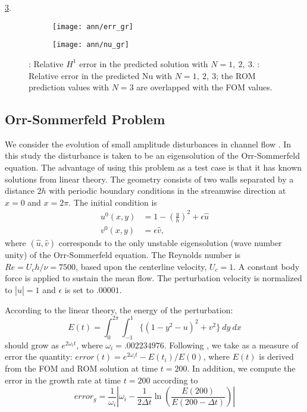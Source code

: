 \ref{fig:5}.  \begin{figure}[h]
     \centering
     \begin{subfigure}[b]{0.45\textwidth}
         \centering
         \texttt{[image: ann/err\_gr]}
         \caption{}
         \label{fig:3_a}
     \end{subfigure}
     \hfill
     \begin{subfigure}[b]{0.45\textwidth}
         \centering
         \texttt{[image: ann/nu\_gr]}
         \caption{}
         \label{fig:3_b}
     \end{subfigure}
     \caption{: Relative $H^1$ error in the predicted solution
     with $N=1,~2,~3$.  : Relative error in the predicted Nu
     with $N=1,~2,~3$; the ROM prediction values with $N=3$ are overlapped with
     the FOM values.} \label{fig:5}
\end{figure}

\subsection{Orr-Sommerfeld Problem}
We consider the evolution of small amplitude disturbances in channel flow \cite{rai1991direct,malik1985spectral}.
In this study the disturbance is taken to be an eigensolution of the
Orr-Sommerfeld equation. The advantage of using this problem as a test case is
that it has known solutions from linear theory.  The geometry consists of two
walls separated by a distance $2h$ with periodic boundary conditions in the
streamwise direction at $x = 0$ and $x = 2\pi$. The initial condition is
\begin{align}
   u^0(x,y) &= 1-(\frac{y}{h})^2 + \epsilon \hat{u} \\ 
   v^0(x,y) &= \epsilon \hat{v},
\end{align}
where $(\hat{u}, \hat{v})$ corresponds to the only unstable eigensolution (wave number unity) of the
Orr-Sommerfeld equation. The Reynolds number is $Re = U_c h / \nu =  7500$, based upon the
centerline velocity, $U_c = 1$. A constant body force is applied to sustain the mean flow.
The perturbation velocity is normalized to $|\hat{u}| = 1$ and $\epsilon$ is set to $.00001$.

According to the linear theory, the energy of the perturbation:
\begin{equation}
   E(t) = \int^{2\pi}_0 \int^1_{-1} \{ (1-y^2-u)^2 + v^2 \} ~dy~dx
\end{equation}
should grow as $e^{2\omega_i t}$, where $\omega_i = .002234976$. Following \cite{malik1985spectral},
we take as a measure of error the quantity: $error(t) = e^{2\omega_i t} - E(t_i)/E(0)$, where $E(t)$ is derived from 
the FOM and ROM solution at time $t=200$. In addition, we compute the error
in the growth rate at time $t = 200$ according to
\begin{equation}
   error_g = \frac{1}{\omega_i} \left|\omega_i - \frac{1}{2\Delta t}\ln \left(\frac{E(200)}{E(200-\Delta t)}\right) \right|
\end{equation}

